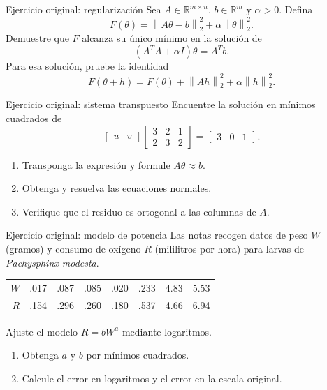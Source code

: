 \documentclass[aspectratio=169,12pt]{beamer}
\newcommand{\R}{\mathbb{R}}
\newcommand{\mat}[1]{\begin{bmatrix}#1\end{bmatrix}}
\newcommand{\norm}[1]{\left\lVert#1\right\rVert}
\begin{document}
\begin{frame}{Ejercicio original: regularización}
Sea $A\in\R^{m\times n}$, $b\in\R^m$ y $\alpha>0$. Defina
\[
F(\theta)=\norm{A\theta-b}_2^2+\alpha\norm{\theta}_2^2.
\]
Demuestre que $F$ alcanza su único mínimo en la solución de
\[
(A^TA+\alpha I)\theta=A^Tb.
\]
Para esa solución, pruebe la identidad
\[
F(\theta+h)=F(\theta)+\norm{Ah}_2^2+\alpha\norm{h}_2^2.
\]
\end{frame}

\begin{frame}{Ejercicio original: sistema transpuesto}
Encuentre la solución en mínimos cuadrados de
\[
\begin{bmatrix}u&v\end{bmatrix}
\mat{3&2&1\\2&3&2}
=\begin{bmatrix}3&0&1\end{bmatrix}.
\]
\begin{enumerate}
\item Transponga la expresión y formule $A\theta\approx b$.
\item Obtenga y resuelva las ecuaciones normales.
\item Verifique que el residuo es ortogonal a las columnas de $A$.
\end{enumerate}
\end{frame}

\begin{frame}{Ejercicio original: modelo de potencia}
Las notas recogen datos de peso $W$ (gramos) y consumo de oxígeno $R$
(mililitros por hora) para larvas de \emph{Pachysphinx modesta}.
\begin{center}\small\begin{tabular}{rrrrrrrr}\toprule
$W$ & .017 & .087 & .085 & .020 & .233 & 4.83 & 5.53\\
$R$ & .154 & .296 & .260 & .180 & .537 & 4.66 & 6.94\\\bottomrule
\end{tabular}\end{center}
Ajuste el modelo $R=bW^a$ mediante logaritmos.
\begin{enumerate}
\item Obtenga $a$ y $b$ por mínimos cuadrados.
\item Calcule el error en logaritmos y el error en la escala original.
\end{enumerate}
\end{frame}
\end{document}
